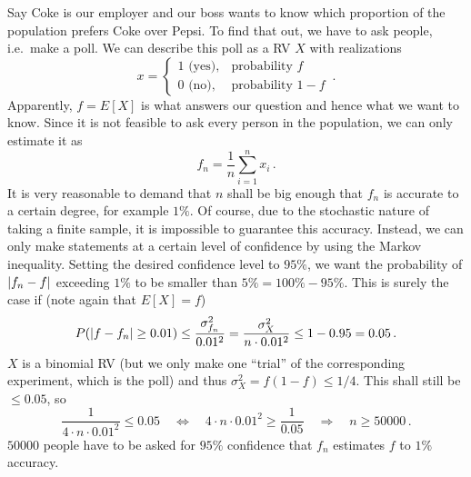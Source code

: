 \begin{ex}
Say Coke is our employer and our boss wants to know which proportion of the population prefers Coke over Pepsi. To find that out, we have to ask people, i.e.~make a poll. We can describe this poll as a RV $X$ with realizations
\begin{equation*}
x = \begin{cases} 1 \text{ (yes)}, & \text{probability } f \\ 0 \text{ (no)}, & \text{probability } 1 - f \end{cases} \, .
\end{equation*}
Apparently, $f = E[X]$ is what answers our question and hence what we want to know. Since it is not feasible to ask every person in the population, we can only estimate it as
\begin{equation*}
f_n = \frac{1}{n} \sum_{i = 1}^n x_i \, .
\end{equation*}
It is very reasonable to demand that $n$ shall be big enough that $f_n$ is accurate to a certain degree, for example $1\%$. Of course, due to the stochastic nature of taking a finite sample, it is impossible to guarantee this accuracy. Instead, we can only make statements at a certain level of confidence by using the Markov inequality. Setting the desired confidence level to $95\%$, we want the probability of $\abs{f_n - f}$ exceeding $1\%$ to be smaller than $5\% = 100\% - 95\%$. This is surely the case if (note again that $E[X] = f$)
\begin{equation*}
P(\abs{f - f_n} \geq 0.01) \leq \frac{\sigma_{f_n}^2}{0.01^2} = \frac{\sigma_X^2}{n \cdot 0.01^2} \leq 1 - 0.95 = 0.05 \, .
\end{equation*}
$X$ is a binomial RV (but we only make one \enquote{trial} of the corresponding experiment, which is the poll) and thus $\sigma_X^2 = f (1 - f) \leq 1 / 4$. This shall still be $\leq 0.05$, so
\begin{equation*}
\frac{1}{4 \cdot n \cdot 0.01^2} \leq 0.05 \quad \Leftrightarrow \quad 4 \cdot n \cdot 0.01^2 \geq \frac{1}{0.05} \quad \Rightarrow \quad n \geq 50 000 \,. 
\end{equation*}
$50 000$ people have to be asked for $95\%$ confidence that $f_n$ estimates $f$ to $1\%$ accuracy.
\end{ex}


